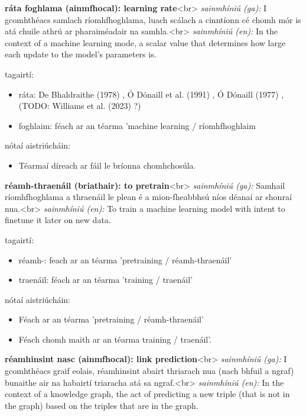 \documentclass{article}
\begin{document}
\textbf{ráta foghlama (ainmfhocal): learning rate}<br>
\textit{sainmhíniú (ga):} I gcomhthéacs samlach ríomhfhoghlama, luach scálach a cinntíonn cé chomh mór is atá chuile athrú ar pharaiméadair na samhla.<br>
\textit{sainmhíniú (en):} In the context of a machine learning mode, a scalar value that determines how large each update to the model's parameters is.

tagairtí:
\begin{itemize}
	\item ráta: De Bhaldraithe (1978) \cite{de-bhaldraithe}, Ó Dónaill et al. (1991) \cite{focloir-beag}, Ó Dónaill (1977) \cite{odonaill}, (TODO: Williams et al. (2023) \cite{storchiste}?)
	\item foghlaim: féach ar an téarma 'machine learning / ríomhfhoghlaim
\end{itemize}

nótaí aistriúcháin:
\begin{itemize}
	\item Téarmaí díreach ar fáil le bríonna chomhchosúla.
\end{itemize}


\textbf{réamh-thraenáil (briathair): to pretrain}<br>
\textit{sainmhíniú (ga):} Samhail ríomhfhoghlama a thraenáil le plean é a mion-fheabbhsú níos déanaí ar shonraí nua.<br>
\textit{sainmhíniú (en):} To train a machine learning model with intent to finetune it later on new data.

tagairtí:
\begin{itemize}
	\item réamh-: feach ar an téarma 'pretraining / réamh-thraenáil'
	\item traenáil: féach ar an téarma 'training / traenáil'
\end{itemize}

nótaí aistriúcháin:
\begin{itemize}
	\item Féach ar an téarma 'pretraining / réamh-thraenáil'
	\item Féach chomh maith ar an téarma training / traenáil'.
\end{itemize}


\textbf{réamhinsint nasc (ainmfhocal): link prediction}<br>
\textit{sainmhíniú (ga):} I gcomhthéacs graif eolais, réamhinsint abairt thriarach nua (nach bhfuil a ngraf) bunaithe air na habairtí triaracha atá sa ngraf.<br>
\textit{sainmhíniú (en):} In the context of a knowledge graph, the act of predicting a new triple (that is not in the graph) based on the triples that are in the graph.
\end{document}
